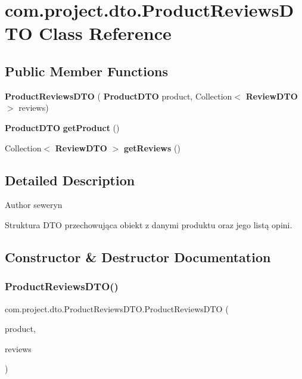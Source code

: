 \section{com.\+project.\+dto.\+Product\+Reviews\+D\+TO Class Reference}
\label{classcom_1_1project_1_1dto_1_1_product_reviews_d_t_o}
\subsection*{Public Member Functions}
\begin{DoxyCompactItemize}
\item 
\textbf{ Product\+Reviews\+D\+TO} (\textbf{ Product\+D\+TO} product, Collection$<$ \textbf{ Review\+D\+TO} $>$ reviews)
\item 
\textbf{ Product\+D\+TO} \textbf{ get\+Product} ()
\item 
Collection$<$ \textbf{ Review\+D\+TO} $>$ \textbf{ get\+Reviews} ()
\end{DoxyCompactItemize}


\subsection{Detailed Description}
\begin{DoxyAuthor}{Author}
seweryn
\end{DoxyAuthor}
Struktura D\+TO przechowująca obiekt z danymi produktu oraz jego listą opini. 

\subsection{Constructor \& Destructor Documentation}
\mbox{\label{classcom_1_1project_1_1dto_1_1_product_reviews_d_t_o_ac97203e6e115fa53605429652ddda9da}} 
\subsubsection{Product\+Reviews\+D\+T\+O()}
{\footnotesize\ttfamily com.\+project.\+dto.\+Product\+Reviews\+D\+T\+O.\+Product\+Reviews\+D\+TO (\begin{DoxyParamCaption}\item[{\textbf{ Product\+D\+TO}}]{product,  }\item[{Collection$<$ \textbf{ Review\+D\+TO} $>$}]{reviews }\end{DoxyParamCaption})}


